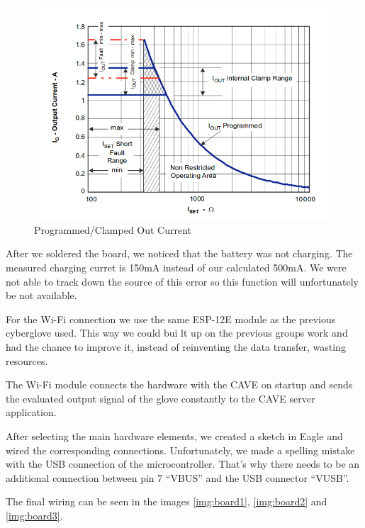 \begin{figure}[!h]
	\centering
	\includegraphics[width=\textwidth]{./images/image1.png}
	\caption{Programmed/Clamped Out Current}
	\label{img:grafik-dummy}
\end{figure}

After we soldered the board, we noticed that the battery was not charging. The measured charging curret is 150mA instead of our calculated 500mA. We were not able to track down the source of this error so this function will unfortunately be not available.

For the Wi-Fi connection we use the same ESP-12E module as the previous cyberglove used.
This way we could bui	lt up on the previous groups work and had the chance to improve it, instead of reinventing the data transfer, wasting resources.

The Wi-Fi module connects the hardware with the CAVE on startup and sends the evaluated output signal of the glove constantly to the CAVE server application.

After selecting the main hardware elements, we created a sketch in Eagle and wired the corresponding connections. Unfortunately, we made a spelling mistake with the USB connection of the microcontroller. That’s why there needs to be an additional connection between pin 7 “VBUS” and the USB connector “VUSB”. 

The final wiring can be seen in the images \ref{img:board1}, \ref{img:board2} and \ref{img:board3}.

